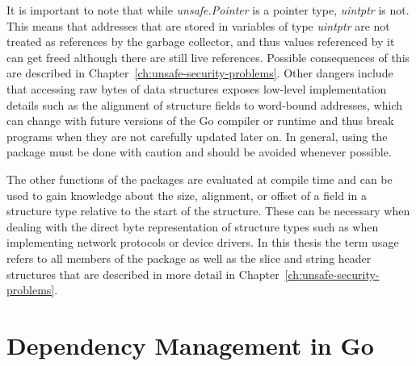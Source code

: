 

It is important to note that while \textit{unsafe.Pointer} is a pointer type, \textit{uintptr} is not.
This means that addresses that are stored in variables of type \textit{uintptr} are not treated as references by the
garbage collector, and thus values referenced by it can get freed although there are still live references.
Possible consequences of this are described in Chapter~\ref{ch:unsafe-security-problems}.
Other dangers include that accessing raw bytes of data structures exposes low-level implementation details such as
the alignment of structure fields to word-bound addresses, which can change with future versions of the Go compiler or
runtime and thus break programs when they are not carefully updated later on.
In general, using the \unsafe{} package must be done with caution and should be avoided whenever possible.

The other functions of the \unsafe{} packages are evaluated at compile time and can be used to gain knowledge about
the size, alignment, or offset of a field in a structure type relative to the start of the structure.
These can be necessary when dealing with the direct byte representation of structure types such as when implementing
network protocols or device drivers.
In this thesis the term \unsafe{} usage refers to all members of the \unsafe{} package as well as the slice and string
header structures that are described in more detail in Chapter~\ref{ch:unsafe-security-problems}.



\section{Dependency Management in Go}\label{sec:background:dependencies}

